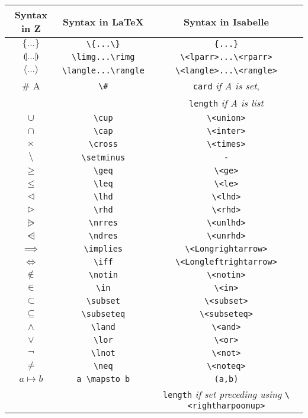 {\def\arraystretch{0.5}\tabcolsep=0.5pt
\begin{longtable}[H]{|c | c | c |}
\hline
\textbf{Syntax in Z} & \textbf{Syntax in \LaTeX} & \textbf{Syntax in Isabelle} \\
\hline
$\{...\}$ & \verb|\{...\}| & \verb|{...}|\\
$\limg...\rimg$ & \verb|\limg...\rimg| & \verb|\<lparr>...\<rparr>| \\
$\langle...\rangle$ & \verb|\langle...\rangle| & \verb|\<langle>...\<rangle>| \\
$\# $ A & \verb|\#| & \verb|card| \textit{if A is set}, \\
& & \verb|length| \textit{if A is list} \\
$\cup $ & \verb|\cup| & \verb|\<union>| \\
$\cap$ & \verb|\cap| & \verb|\<inter>| \\
$\times$ & \verb|\cross| & \verb|\<times>| \\
$\setminus$ & \verb|\setminus| & \verb|-| \\
$\geq$ & \verb|\geq| & \verb|\<ge>| \\
$\leq$ & \verb|\leq| & \verb|\<le>| \\
$\lhd$ & \verb|\lhd| & \verb|\<lhd>| \\
$\rhd$ & \verb|\rhd| & \verb|\<rhd>| \\
$\nrres$ & \verb|\nrres| & \verb|\<unlhd>| \\
$\ndres$ & \verb|\ndres| & \verb|\<unrhd>| \\
$\implies$ & \verb|\implies| & \verb|\<Longrightarrow>| \\
$\iff$ & \verb|\iff| & \verb|\<Longleftrightarrow>| \\
$\notin$ & \verb|\notin| & \verb|\<notin>| \\
$\in$ & \verb|\in| & \verb|\<in>| \\
$\subset$ & \verb|\subset| & \verb|\<subset>| \\
$\subseteq$ & \verb|\subseteq| & \verb|\<subseteq>| \\
$\land$ & \verb|\land| & \verb|\<and>| \\
$\lor$ & \verb|\lor| & \verb|\<or>| \\
$\lnot$ & \verb|\lnot| & \verb|\<not>| \\
$\neq$ & \verb|\neq| & \verb|\<noteq>| \\
$a \mapsto b$ & \verb|a \mapsto b| & \verb|(a,b)| \\
& & \verb|length| \textit{if set preceding using} \verb|\<rightharpoonup>| \\

\end{longtable}}
